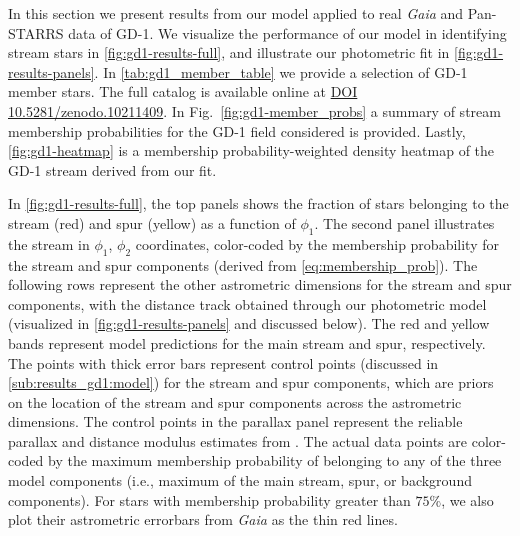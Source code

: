 \documentclass[twocolumn, linenumbers]{aastex631}
\newcommand{\stream}[1]{#1}
\newcommand{\dataarchive}[1]{\textit{#1}}
\newcommand{\Gaia}{\dataarchive{Gaia}}
\begin{document}
        In this section we present results from our model applied to real \Gaia{} and Pan-STARRS data of \stream{GD-1}.  We visualize the
        performance of our model in identifying stream stars in
        \autoref{fig:gd1-results-full}, and illustrate our photometric fit in
        \autoref{fig:gd1-results-panels}. In \autoref{tab:gd1_member_table} we
        provide a selection of \stream{GD-1} member stars. The full catalog is
        available online at
        \href{https://zenodo.org/doi/10.5281/zenodo.10903751}{DOI 10.5281/zenodo.10211409}. In Fig.~\ref{fig:gd1-member_probs} a summary of stream membership probabilities for the GD-1 field considered is provided.  Lastly,
        \autoref{fig:gd1-heatmap} is a membership probability-weighted density
        heatmap of the \stream{GD-1} stream derived from our fit.


        In \autoref{fig:gd1-results-full}, the top panels shows the fraction of
        stars belonging to the stream (red) and spur (yellow) as a function of
        $\phi_1$. The second panel illustrates the stream in $\phi_1$, $\phi_2$
        coordinates, color-coded by the membership probability for the stream
        and spur components (derived from \autoref{eq:membership_prob}). The
        following rows represent the other astrometric dimensions for the stream
        and spur components, with the distance track obtained through our
        photometric model (visualized in \autoref{fig:gd1-results-panels} and
        discussed below). The red and yellow bands represent model predictions
        for the main stream and spur, respectively. The points with thick error
        bars represent control points (discussed in
        \autoref{sub:results_gd1:model}) for the stream and spur components,
        which are priors on the location of the stream and spur components
        across the astrometric dimensions. The control points in the parallax
        panel represent the reliable parallax and distance modulus estimates
        from \citet{deBoer+2020}. The actual data points are color-coded by the
        maximum membership probability of belonging to any of the three model
        components (i.e., maximum of the main stream, spur, or background
        components). For stars with membership probability greater than $75\%$,
        we also plot their astrometric errorbars from \Gaia{} as the thin red
        lines.
\end{document}

